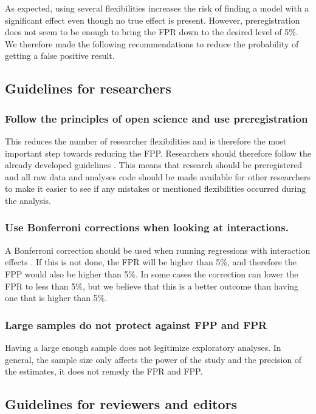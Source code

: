 As expected, using several flexibilities increases the risk of finding a model with a significant effect even though no true effect is present. However, preregistration does not seem to be enough to bring the FPR down to the desired level of 5\%. We therefore made the following recommendations to reduce the probability of getting a false positive result. 

\subsection{Guidelines for researchers}

\subsubsection{Follow the principles of open science and use preregistration}
This reduces the number of researcher flexibilities and is therefore the most important step towards reducing the FPP. Researchers should therefore follow the already developed guidelines \citep{Nosek2015}. This means that research should be preregistered and all raw data and analyses code should be made available for other researchers to make it easier to see if any mistakes or mentioned flexibilities occurred during the analysis. 
\subsubsection{Use Bonferroni corrections when looking at interactions.}
A Bonferroni correction should be used when running regressions with interaction effects . If this is not done, the FPR will be higher than 5\%, and therefore the FPP would also be higher than 5\%. In some cases the correction can lower the FPR to less than 5\%, but we believe that this is a better outcome than having one that is higher than 5\%. 
\subsubsection{Large samples do not protect against FPP and FPR}
Having a large enough sample does not legitimize exploratory analyses. In general, the sample size only affects the power of the study and the precision of the estimates, it does not remedy the FPR and FPP. 

\subsection{Guidelines for reviewers and editors}

